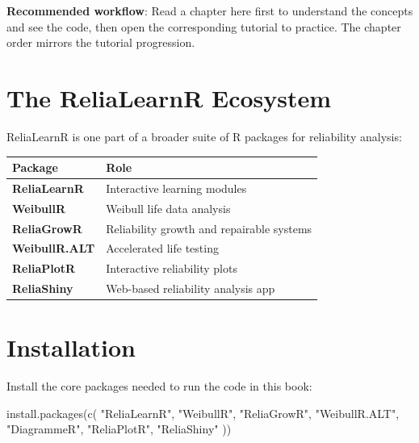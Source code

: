 \documentclass[
  letterpaper,
  DIV=11,
  numbers=noendperiod]{scrreprt}
\newenvironment{Shaded}{\begin{snugshade}}{\end{snugshade}}
\newcommand{\FunctionTok}[1]{\textcolor[rgb]{0.28,0.35,0.67}{#1}}
\newcommand{\NormalTok}[1]{\textcolor[rgb]{0.00,0.23,0.31}{#1}}
\newcommand{\StringTok}[1]{\textcolor[rgb]{0.13,0.47,0.30}{#1}}
\newcounter{none} %
\begin{document}
\textbf{Recommended workflow}: Read a chapter here first to understand
the concepts and see the code, then open the corresponding tutorial to
practice. The chapter order mirrors the tutorial progression.

\section*{The ReliaLearnR Ecosystem}\label{the-relialearnr-ecosystem}


ReliaLearnR is one part of a broader suite of R packages for reliability
analysis:

{\def\LTcaptype{none} %
\begin{longtable}[]{@{}ll@{}}
\toprule\noalign{}
Package & Role \\
\midrule\noalign{}
\endhead
\bottomrule\noalign{}
\endlastfoot
\textbf{ReliaLearnR} & Interactive learning modules \\
\textbf{WeibullR} & Weibull life data analysis \\
\textbf{ReliaGrowR} & Reliability growth and repairable systems \\
\textbf{WeibullR.ALT} & Accelerated life testing \\
\textbf{ReliaPlotR} & Interactive reliability plots \\
\textbf{ReliaShiny} & Web-based reliability analysis app \\
\end{longtable}
}

\section*{Installation}\label{installation}


Install the core packages needed to run the code in this book:

\begin{Shaded}
\begin{Highlighting}[]
\FunctionTok{install.packages}\NormalTok{(}\FunctionTok{c}\NormalTok{(}
  \StringTok{"ReliaLearnR"}\NormalTok{,}
  \StringTok{"WeibullR"}\NormalTok{,}
  \StringTok{"ReliaGrowR"}\NormalTok{,}
  \StringTok{"WeibullR.ALT"}\NormalTok{,}
  \StringTok{"DiagrammeR"}\NormalTok{,}
  \StringTok{"ReliaPlotR"}\NormalTok{,}
  \StringTok{"ReliaShiny"}
\NormalTok{))}
\end{Highlighting}
\end{Shaded}
\end{document}
